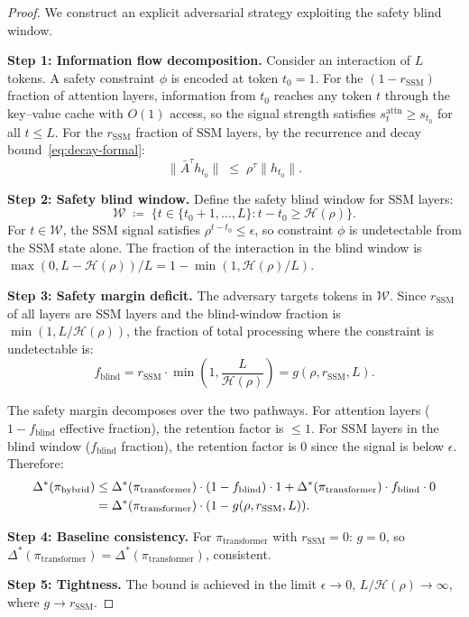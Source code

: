 \documentclass{article}
\newcommand{\rSSM}{r_{\mathrm{SSM}}}
\newcommand{\deltaStar}{\Delta^{*}}
\newcommand{\piHybrid}{\pi_{\mathrm{hybrid}}}
\newcommand{\piTrans}{\pi_{\mathrm{transformer}}}
\newcommand{\Horizon}{\mathcal{H}(\rho)}
\begin{document}
\begin{proof}
We construct an explicit adversarial strategy exploiting the safety blind window.

\medskip
\noindent\textbf{Step 1: Information flow decomposition.}
Consider an interaction of $L$ tokens. A safety constraint $\phi$ is encoded at token $t_0 = 1$. For the $(1-\rSSM)$ fraction of attention layers, information from $t_0$ reaches any token $t$ through the key--value cache with $O(1)$ access, so the signal strength satisfies $s^{\mathrm{attn}}_t \geq s_{t_0}$ for all $t \leq L$. For the $\rSSM$ fraction of SSM layers, by the recurrence and decay bound~\eqref{eq:decay-formal}:
\begin{equation}
    \bigl\|\bar{A}^\tau h_{t_0}\bigr\| \;\leq\; \rho^\tau \|h_{t_0}\|.
\end{equation}

\medskip
\noindent\textbf{Step 2: Safety blind window.}
Define the safety blind window for SSM layers:
\begin{equation}
    \mathcal{W} \;\coloneqq\; \bigl\{t \in \{t_0{+}1, \ldots, L\} : t - t_0 \geq \Horizon\bigr\}.
\end{equation}
For $t \in \mathcal{W}$, the SSM signal satisfies $\rho^{t-t_0} \leq \epsilon$, so constraint $\phi$ is undetectable from the SSM state alone. The fraction of the interaction in the blind window is $\max(0, L - \Horizon)/L = 1 - \min(1, \Horizon/L)$.

\medskip
\noindent\textbf{Step 3: Safety margin deficit.}
The adversary targets tokens in $\mathcal{W}$. Since $\rSSM$ of all layers are SSM layers and the blind-window fraction is $\min(1, L/\Horizon)$, the fraction of total processing where the constraint is undetectable is:
\begin{equation}
    f_{\mathrm{blind}} = \rSSM \cdot \min\!\left(1, \frac{L}{\Horizon}\right) = g(\rho, \rSSM, L).
\end{equation}

The safety margin decomposes over the two pathways. For attention layers ($1 - f_{\mathrm{blind}}$ effective fraction), the retention factor is $\leq 1$. For SSM layers in the blind window ($f_{\mathrm{blind}}$ fraction), the retention factor is 0 since the signal is below $\epsilon$. Therefore:
\begin{align}
    \deltaStar(\piHybrid) &\leq \deltaStar(\piTrans) \cdot (1 - f_{\mathrm{blind}}) \cdot 1 + \deltaStar(\piTrans) \cdot f_{\mathrm{blind}} \cdot 0 \notag\\
    &= \deltaStar(\piTrans) \cdot (1 - g(\rho, \rSSM, L)).
\end{align}

\noindent\textbf{Step 4: Baseline consistency.}
For $\piTrans$ with $\rSSM = 0$: $g = 0$, so $\deltaStar(\piTrans) = \deltaStar(\piTrans)$, consistent.

\noindent\textbf{Step 5: Tightness.}
The bound is achieved in the limit $\epsilon \to 0$, $L/\Horizon \to \infty$, where $g \to \rSSM$.
\end{proof}
\end{document}
